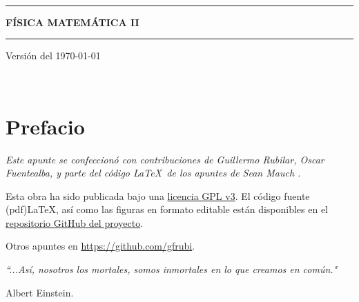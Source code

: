 \documentclass[letterpaper,11pt]{report}
\begin{document}
\sffamily

\thispagestyle{empty}
\begin{center}

\ 

\vspace{6.5cm}

\rule{15cm}{0.1cm}

\vspace{1.5cm}

{\huge \textsc{\textbf{FÍSICA MATEMÁTICA II}}}

\vspace{1.5cm}

\rule{15cm}{0.1cm}

\vspace{1.5cm}

Versión del \today

\end{center}


\newpage
\thispagestyle{empty}
\ \\
\newpage
\setcounter{page}{1}

\pagestyle{plain}
\chapter*{Prefacio}
\bigskip
\bigskip
\bigskip
\bigskip
\bigskip
\bigskip



\bigskip\emph{Este apunte se confeccionó con contribuciones de Guillermo Rubilar, Oscar Fuentealba, y parte del código \LaTeX\, de los apuntes de Sean Mauch \cite{Mauch}.} 

\bigskip
\bigskip
\bigskip
\bigskip
\bigskip



Esta obra ha sido publicada bajo una \href{https://github.com/gfrubi/FM2/blob/master/LICENSE}{licencia GPL v3}. El código fuente (pdf)\LaTeX, así como las figuras en formato editable están disponibles en el \href{https://github.com/gfrubi/FM2}{repositorio GitHub del proyecto}.

\bigskip
\bigskip
\bigskip
\bigskip
\bigskip
\bigskip

Otros apuntes en \url{https://github.com/gfrubi}.

\bigskip
\bigskip
\bigskip
\bigskip
\bigskip
\bigskip





\emph{\textquotedblleft ...Así, nosotros los mortales, somos
inmortales en lo que creamos en común."}

\begin{flushright}
Albert Einstein.
\end{flushright}
\newpage

\tableofcontents
{}
\setcounter{page}{1}








\appendix





\end{document}
